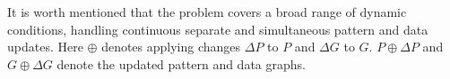 It is worth mentioned that the \dynteamF{} problem covers a broad range of dynamic conditions,
\ie handling continuous separate and simultaneous pattern and data updates.
Here $\oplus$ denotes applying changes $\Delta P$ to $P$ and $\Delta G$ to $G$.
 $P\oplus\Delta P$ and $G\oplus\Delta G$ denote the updated pattern and data graphs.





